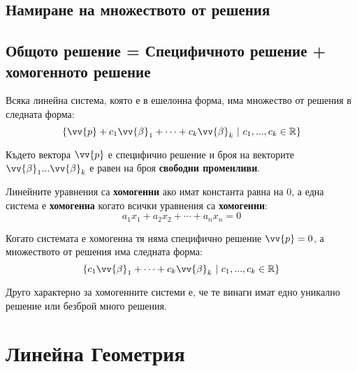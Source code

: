 \documentclass[12pt]{article}
\begin{document}
\subsection{Намиране на множеството от решения}






\subsection{Общото решение = Специфичното решение + хомогенното решение}

\noindent Всяка линейна система, която е в ешелонна форма, има множество от решения в следната форма:
\begin{equation*}
    \{ \vv{p} + c_{1}\vv{\beta}_{1} + \cdots + c_{k}\vv{\beta}_{k}\ |\ c_{1},...,c_{k} \in \mathbb{R}\}
\end{equation*}

\noindent Където вектора $\vv{p}$ е специфично решение и броя на векторите $\vv{\beta}_{1} ... \vv{\beta}_{k}$ е равен на броя \textbf{свободни променливи}.

\noindent Линейните уравнения са \textbf{хомогенни} ако имат константа равна на 0, а една система е \textbf{хомогенна} когато всички уравнения са \textbf{хомогенни}:
\begin{equation*}
    a_{1}x_{1} + a_{2}x_{2} + \cdots + a_{n}x_{n} = 0
\end{equation*}

\noindent Когато системата е хомогенна тя няма специфично решение $\vv{p} = 0$, а множеството от решения има следната форма:
\begin{equation*}
    \{ c_{1}\vv{\beta}_{1} + \cdots + c_{k}\vv{\beta}_{k}\ |\ c_{1},...,c_{k} \in \mathbb{R}\}
\end{equation*}

\noindent Друго характерно за хомогенните системи е, че те винаги имат едно уникално решение или безброй много решения.




\section{Линейна Геометрия}
\end{document}
